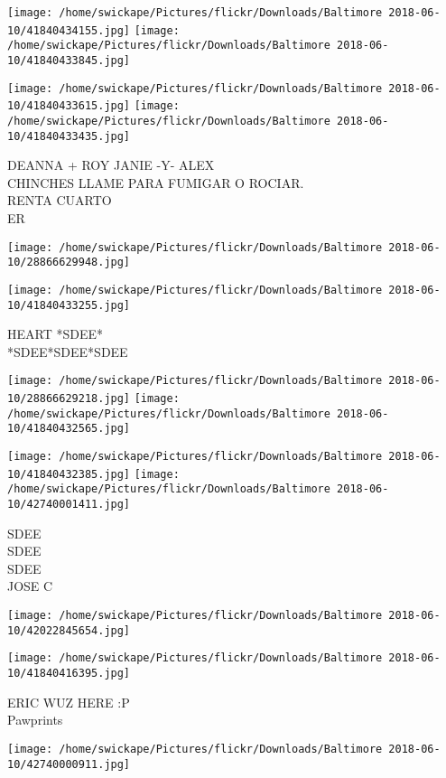 \documentclass[10pt,letterpaper]{article}
\begin{document}
\texttt{[image: /home/swickape/Pictures/flickr/Downloads/Baltimore 2018-06-10/41840434155.jpg]}
\texttt{[image: /home/swickape/Pictures/flickr/Downloads/Baltimore 2018-06-10/41840433845.jpg]}

\texttt{[image: /home/swickape/Pictures/flickr/Downloads/Baltimore 2018-06-10/41840433615.jpg]}
\texttt{[image: /home/swickape/Pictures/flickr/Downloads/Baltimore 2018-06-10/41840433435.jpg]}

DEANNA + ROY JANIE {-}Y{-} ALEX\\
CHINCHES LLAME PARA FUMIGAR O ROCIAR.\\
RENTA CUARTO\\
ER
\pagebreak

\texttt{[image: /home/swickape/Pictures/flickr/Downloads/Baltimore 2018-06-10/28866629948.jpg]}

\vspace{0.25in}
\texttt{[image: /home/swickape/Pictures/flickr/Downloads/Baltimore 2018-06-10/41840433255.jpg]}

HEART *SDEE*\\
*SDEE*SDEE*SDEE
\pagebreak

\texttt{[image: /home/swickape/Pictures/flickr/Downloads/Baltimore 2018-06-10/28866629218.jpg]}
\texttt{[image: /home/swickape/Pictures/flickr/Downloads/Baltimore 2018-06-10/41840432565.jpg]}

\texttt{[image: /home/swickape/Pictures/flickr/Downloads/Baltimore 2018-06-10/41840432385.jpg]}
\texttt{[image: /home/swickape/Pictures/flickr/Downloads/Baltimore 2018-06-10/42740001411.jpg]}

SDEE\\
SDEE\\
SDEE\\
JOSE C
\pagebreak

\texttt{[image: /home/swickape/Pictures/flickr/Downloads/Baltimore 2018-06-10/42022845654.jpg]}

\vspace{0.25in}
\texttt{[image: /home/swickape/Pictures/flickr/Downloads/Baltimore 2018-06-10/41840416395.jpg]}

ERIC WUZ HERE :P\\
Pawprints
\pagebreak

\texttt{[image: /home/swickape/Pictures/flickr/Downloads/Baltimore 2018-06-10/42740000911.jpg]}
\end{document}
